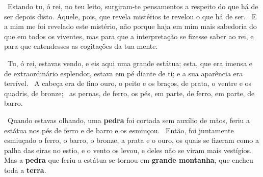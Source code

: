\documentclass[12pt,aspectratio=169]{beamer}
\newcommand{\ver}[1]{%
    \raisebox{0.50ex}{%
        \scalebox{1.1}{%
            \pmb{\textbf{\textcolor{BSpbg}{#1}}}%
        }%
    }%
}
\newcommand{\QUOTE}[1]{%
    \par\noindent\hspace*{0.1\linewidth}%
    \begin{minipage}{0.8\linewidth}%
        \linespread{1.35}\large{#1}%
    \end{minipage}%
}
\newcommand{\ORA}[1]{{\textcolor{TXora}{#1}}}
\newcommand{\YEL}[1]{{\textcolor{TXyel}{#1}}}
\newcommand{\GRE}[1]{{\textcolor{TXgre}{#1}}}
\newcommand{\CYA}[1]{{\textcolor{TXcya}{#1}}}
\newcommand{\BLU}[1]{{\textcolor{TXblu}{#1}}}
\newcommand{\MAG}[1]{{\textcolor{TXmag}{#1}}}
\newcommand{\BRI}[1]{{\textcolor{BSpbg}{#1}}}   %
\begin{document}
    \begin{frame}
        \QUOTE{%
            \ver{(ARA) Dn~2.29}~\GRE{Estando  tu,  ó  rei,  no   teu   leito,   surgiram-te
            pensamentos a respeito do que há de ser depois disto}.  \MAG{Aquele,  pois,  que
            revela mistérios} te revelou \YEL{o que há de ser}.  \ver{30}~E  a  mim  me  foi
            revelado este mistério, não porque haja em mim mais sabedoria do que em todos os
            viventes, mas para que a interpretação se fizesse  saber  ao  rei,  e  para  que
            entendesses as \GRE{cogitações da tua mente}.
        }
    \end{frame}

    \begin{frame}
        \QUOTE{%
            \ver{(ARA) Dn~2.31}~Tu, ó  rei,  estavas  vendo,  e  eis  aqui  \BRI{uma  grande
            estátua}; esta, que era imensa e de extraordinário esplendor, estava \BRI{em pé}
            diante de ti; e a sua \BRI{aparência era terrível}. \ver{32}~A \BRI{cabeça}  era
            de fino ouro, o \BRI{peito e os braços}, de prata, o \BRI{ventre e os  quadris},
            de bronze; \ver{33}~as \BRI{pernas}, de ferro, os \BRI{pés}, em parte, de ferro,
            em parte, de barro.
        }
    \end{frame}

    \begin{frame}
        \QUOTE{%
            \ver{(ARA) Dn~2.34}~Quando estavas olhando, \CYA{uma \textbf{pedra}} foi cortada
            \CYA{sem auxílio de mãos}, \ORA{feriu} a estátua nos pés de ferro e de  barro  e
            os \ORA{esmiuçou}. \ver{35}~Então, foi juntamente esmiuçado o ferro, o barro,  o
            bronze, a prata e o ouro, os quais se fizeram como a palha das eiras no estio, e
            o  vento  os  levou,  e   deles   não   se   viram   mais   vestígios.   Mas   a
            \CYA{\textbf{pedra}} que  feriu  a  estátua  se  tornou  em  \CYA{\textbf{grande
            montanha}}, que \BLU{encheu toda a \textbf{terra}}.
        }
    \end{frame}





\end{document}
